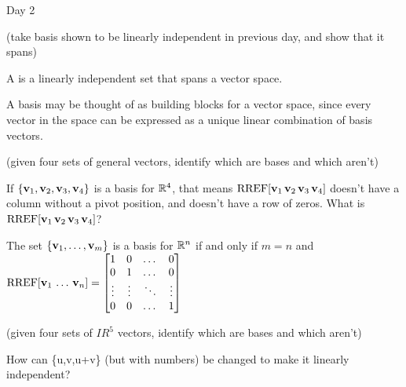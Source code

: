 
\begin{applicationActivities}{Day 2}

\begin{activity}{10}
  (take basis shown to be linearly independent in previous day, and
  show that it spans)
\end{activity}

\begin{definition}
  A  is a linearly independent set that spans a vector space.
\end{definition}

\begin{observation}
  A basis may be thought of as building blocks for a vector space, since
  every vector in the space can be expressed as a unique linear combination
  of basis vectors.
\end{observation}

\begin{activity}{10}
  (given four sets of general vectors, identify which are bases and which aren't)
\end{activity}

\begin{activity}{10}
  If \(\{\mathbf v_1,\mathbf v_2,\mathbf v_3,\mathbf v_4\}\) is a basis for
  \(\mathbb{R}^4\), that means \(\operatorname{RREF}[\mathbf v_1\,\mathbf v_2\,\mathbf v_3\,\mathbf v_4]\)
  doesn't have a column without a pivot position, and doesn't have a
  row of zeros. What is \(\operatorname{RREF}[\mathbf v_1\,\mathbf v_2\,\mathbf v_3\,\mathbf v_4]\)?
\end{activity}

\begin{fact}
  The set \(\{\mathbf v_1,\dots,\mathbf v_m\}\) is a basis for \(\mathbb{R}^n\) if and
  only if \(m=n\) and
  \(\operatorname{RREF}[\mathbf v_1\,\dots\,\mathbf v_n]=
  \begin{bmatrix}
    1&0&\dots&0\\
    0&1&\dots&0\\
    \vdots&\vdots&\ddots&\vdots\\
    0&0&\dots&1
  \end{bmatrix}
  \)
\end{fact}

\begin{activity}{10}
  (given four sets of \(IR^5\) vectors, identify which are bases and which
  aren't)
\end{activity}

\begin{activity}{10}
  How can \{u,v,u+v\} (but with numbers) be changed to make it
  linearly independent?
\end{activity}

\end{applicationActivities}

